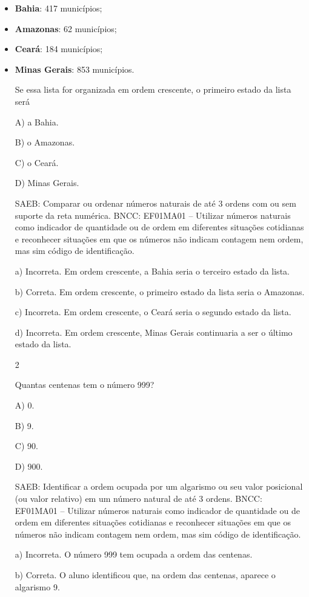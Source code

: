 \begin{itemize}
  \item \textbf{Bahia}: 417 municípios;
  \item \textbf{Amazonas}: 62 municípios;
  \item \textbf{Ceará}: 184 municípios;
  \item \textbf{Minas Gerais}: 853 municípios.
\begin{itemize}

Se essa lista for organizada em ordem crescente, o primeiro estado da lista será

A) a Bahia.

B) o Amazonas.

C) o Ceará.

D) Minas Gerais.

SAEB: Comparar ou ordenar números naturais de até 3 ordens com
ou sem suporte da reta numérica.
BNCC: EF01MA01 -- Utilizar números naturais como indicador de quantidade
ou de ordem em diferentes situações cotidianas e reconhecer situações em
que os números não indicam contagem nem ordem, mas sim código de
identificação.

a) Incorreta. Em ordem crescente, a Bahia seria o terceiro estado da lista.

b) Correta. Em ordem crescente, o primeiro estado da lista seria o Amazonas.

c) Incorreta. Em ordem crescente, o Ceará seria o segundo estado da lista.

d) Incorreta. Em ordem crescente, Minas Gerais continuaria a ser o último estado da lista.

\num{2}

Quantas centenas tem o número 999?

A) 0.

B) 9.

C) 90.

D) 900.

SAEB: Identificar a ordem ocupada por um algarismo ou seu valor
posicional (ou valor relativo) em um número natural de até 3 ordens.
BNCC: EF01MA01 -- Utilizar números naturais como indicador de quantidade
ou de ordem em diferentes situações cotidianas e reconhecer situações em
que os números não indicam contagem nem ordem, mas sim código de
identificação.

a) Incorreta. O número 999 tem ocupada a ordem das centenas.

b) Correta. O aluno identificou que, na ordem das centenas, aparece o
algarismo 9.


\end{itemize}
\end{itemize}
